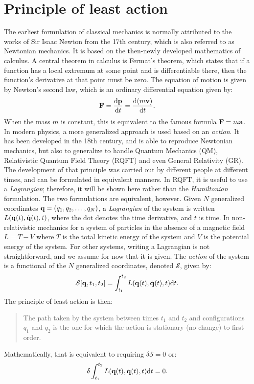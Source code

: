 \section{Principle of least action}
\label{sec:least-action}
The earliest formulation of classical mechanics is normally attributed to the works of Sir Isaac Newton from the 17th century, which is also referred to as Newtonian mechanics. It is based on the then-newly developed mathematics of calculus. A central theorem in calculus is Fermat's theorem, which states that if a function has a local extremum at some point and is differentiable there, then the function's derivative at that point must be zero. The equation of motion is given by Newton's second law, which is an ordinary differential equation given by:
\begin{equation}
\vb{F}=\dv{\vb{p}}{t}=\dv{(m\vb{v})}{t}.
\label{eq:newton-second-law}
\end{equation}
When the mass $m$ is constant, this is equivalent to the famous formula $\vb{F}=m\vb{a}$. In modern physics, a more generalized approach is used based on an \emph{action}. It has been developed in the 18th century, and is able to reproduce Newtonian mechanics, but also to generalize to handle Quantum Mechanics (QM), Relativistic Quantum Field Theory (RQFT) and even General Relativity (GR). The development of that principle was carried out by different people at different times, and can be formulated in equivalent manners. In RQFT, it is useful to use a \emph{Lagrangian}; therefore, it will be shown here rather than the \emph{Hamiltonian} formulation. The two formulations are equivalent, however. Given $N$ generalized coordinates $\vb{q}=\qty(q_1,q_2,\ldots,q_N)$, a \emph{Lagrangian} of the system is written $L\qty( \vb{q}\qty(t), \dot{\vb{q}}\qty(t), t )$, where the dot denotes the time derivative, and $t$ is time. In non-relativistic mechanics for a system of particles in the absence of a magnetic field  $L=T-V$ where $T$ is the total kinetic energy of the system and $V$ is the potential energy of the system. For other systems, writing a Lagrangian is not straightforward, and we assume for now that it is given. The \emph{action} of the system is a functional of the $N$ generalized coordinates, denoted $\mathcal{S}$, given by:
\begin{equation}
\mathcal{S}\qty[ \vb{q}, t_1, t_2 ] = \int^{t_2}_{t_1} L\qty( \vb{q}\qty(t), \dot{\vb{q}}\qty(t), t ) \dd t.
\end{equation}
The principle of least action is then:
\begin{quote}
The path taken by the system between times $t_1$ and $t_2$ and configurations $q_1$ and $q_2$ is the one for which the action is stationary (no change) to first order.
\end{quote}
Mathematically, that is equivalent to requiring $\delta \mathcal{S}=0$ or:
\begin{equation}
\delta \int^{t_2}_{t_1} L\qty( \vb{q}\qty(t), \dot{\vb{q}}\qty(t), t ) \dd t = 0.
\label{eq:principle-of-least-action}
\end{equation}


